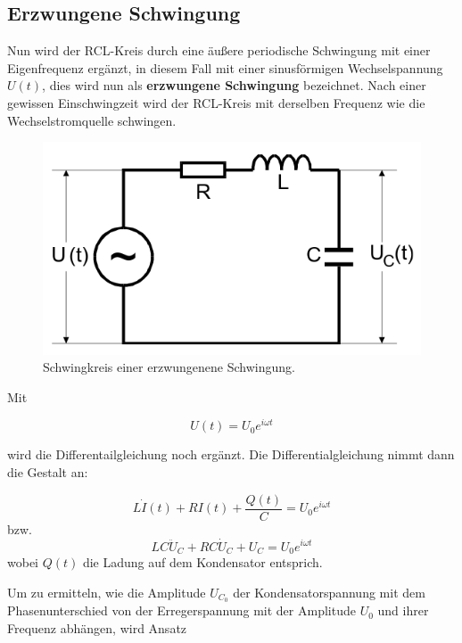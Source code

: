 \subsection{Erzwungene Schwingung}


Nun wird der RCL-Kreis durch eine äußere periodische Schwingung mit einer Eigenfrequenz ergänzt,
in diesem Fall mit einer sinusförmigen Wechselspannung $U(t)$, dies wird nun als \textbf{erzwungene Schwingung} bezeichnet.
Nach einer gewissen Einschwingzeit wird der RCL-Kreis mit derselben Frequenz wie die Wechselstromquelle schwingen.

\begin{figure}[h]
  \centering
  \includegraphics[scale=0.5]{eSchwingkreis.png}
  \caption{Schwingkreis einer erzwungenene Schwingung.}
  \label{eSchwingung}
\end{figure}
Mit

\begin{equation*}
  U(t) = U_0 e^{i \omega t}
\end{equation*}

wird die Differentailgleichung noch ergänzt. Die Differentialgleichung nimmt dann die Gestalt an:

\begin{equation*}
  \label{DGL2}
  L \dot{I}(t) + R I(t) + \frac{Q(t)}{C} = U_0 e^{i \omega t}
\end{equation*}
 bzw.
 \begin{equation*}
   \label{DGL3}
   LC \ddot{U}_C + RC \dot{U}_C + U_C = U_0 e^{i \omega t}
 \end{equation*}
 wobei $Q(t)$ die Ladung auf dem Kondensator entsprich.

 Um zu ermitteln, wie die Amplitude $U_{C_0}$ der Kondensatorspannung mit dem Phasenunterschied von der Erregerspannung
 mit der Amplitude $U_0$ und ihrer Frequenz abhängen, wird Ansatz

